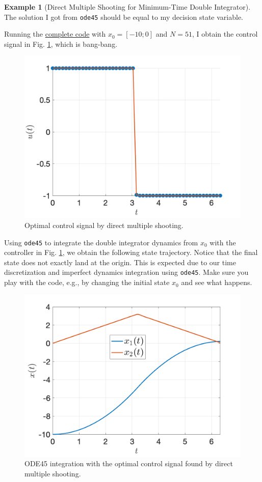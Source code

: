 \documentclass[
]{book}
\theoremstyle{definition}
\theoremstyle{definition}
\newtheorem{example}{Example}[chapter]
\theoremstyle{definition}
\theoremstyle{definition}
\theoremstyle{remark}
\begin{document}
\begin{example}[Direct Multiple Shooting for Minimum-Time Double Integrator]
The solution I got from \texttt{ode45} should be equal to my decision state variable.

Running the \href{https://github.com/ComputationalRobotics/OptimalControlEstimation-Examples/blob/main/double_integrator_multiple_shooting.m}{complete code} with \(x_0 = [-10;0]\) and \(N=51\), I obtain the control signal in Fig. \ref{fig:min-time-di-u-ms}, which is bang-bang.

\begin{figure}

{\centering \includegraphics[width=0.7\linewidth]{images/min_time_di_u} 

}

\caption{Optimal control signal by direct multiple shooting.}\label{fig:min-time-di-u-ms}
\end{figure}

Using \texttt{ode45} to integrate the double integrator dynamics from \(x_0\) with the controller in Fig. \ref{fig:min-time-di-u-ms}, we obtain the following state trajectory. Notice that the final state does not exactly land at the origin. This is expected due to our time discretization and imperfect dynamics integration using \texttt{ode45}. Make sure you play with the code, e.g., by changing the initial state \(x_0\) and see what happens.

\begin{figure}

{\centering \includegraphics[width=0.7\linewidth]{images/min_time_di_x} 

}

\caption{ODE45 integration with the optimal control signal found by direct multiple shooting.}\label{fig:min-time-di-x-ms}
\end{figure}

\end{example}
\end{document}
